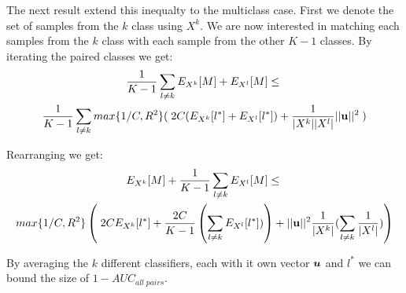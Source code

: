 The next result extend this inequalty to the multiclass case. First we denote the set of samples from the $k$ class using $X^k$. We are now interested in matching each samples from the $k$ class with each sample from the other $K-1$ classes. By iterating the paired classes we get: 
\begin{multline}
\frac{1}{K-1} \sum\limits_{l \neq k} E_{X^k}[M] + E_{X^l}[M] \leq \; \\
\frac{1}{K-1} \sum\limits_{l \neq k} max\{1/C, R^2\}( \; 2C (E_{X^k}[l^{*}] + E_{X^l}[l^{*}]) + \frac{1}{|X^k| |X^l|}  ||{\bf u}||^2  \;) 
\end{multline}

Rearranging we get:
\begin{multline}
E_{X^k}[M] + \frac{1}{K-1} \sum\limits_{l \neq k}  E_{X^l}[M] \leq \; \\
max\{1/C, R^2\} \left( \; 2C E_{X^k}[l^{*}] + \frac{2C}{K-1} \left( \sum\limits_{l \neq k}  E_{X^l}[l^{*}]) \right) + ||{\bf u}||^2 \frac{1}{|X^k|} ( \sum\limits_{l \neq k} \frac{1}{|X^l|})    \right) 
\end{multline}

By averaging the $k$ different classifiers, each with it own vector $\bm{u}$ and $l^*$ we can bound the size of $ 1 - AUC_{all \; pairs}$.
\hfill\BlackBox
